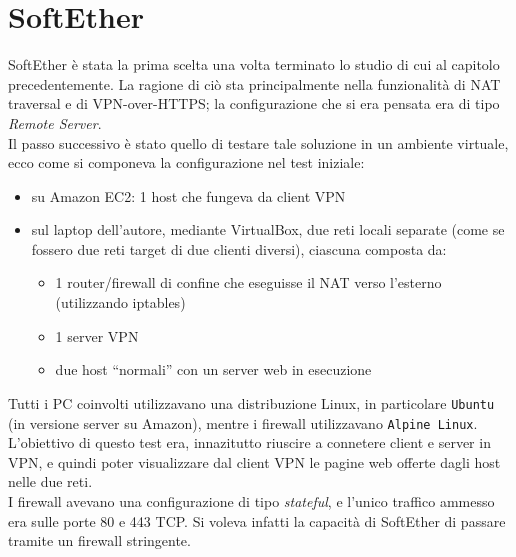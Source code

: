 \section{SoftEther}
SoftEther è stata la prima scelta una volta terminato lo studio di cui al
capitolo precedentemente. La ragione di ciò
sta principalmente nella funzionalità di NAT traversal e di VPN-over-HTTPS; la
configurazione che si era pensata era di tipo \textit{Remote Server}.\\
Il passo successivo è stato quello di testare tale soluzione in un ambiente virtuale,
ecco come si componeva la configurazione nel test
iniziale:
\begin{itemize}
  \item su Amazon EC2: 1 host che fungeva da client VPN
  \item sul laptop dell'autore, mediante VirtualBox, due reti locali separate (come
  se fossero due reti target di due clienti diversi), ciascuna composta da:
  \begin{itemize}
    \item 1 router/firewall di confine che eseguisse il NAT verso l'esterno
    (utilizzando iptables)
    \item 1 server VPN
    \item due host ``normali'' con un server web in esecuzione
  \end{itemize}
\end{itemize}
Tutti i PC coinvolti utilizzavano una distribuzione Linux, in particolare \texttt{Ubuntu}
(in versione server su Amazon), mentre i firewall utilizzavano \texttt{Alpine Linux}.\\
L'obiettivo di questo test era, innazitutto riuscire a connetere client e server in
VPN, e quindi poter visualizzare dal client VPN le pagine web offerte dagli host
nelle due reti.\\
I firewall avevano una configurazione di tipo \textit{stateful}, e l'unico traffico
ammesso era sulle porte 80 e 443 TCP. Si voleva infatti la capacità di SoftEther di passare
tramite un firewall stringente.


